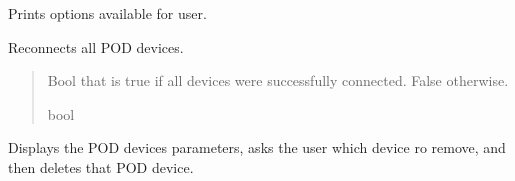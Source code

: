 \documentclass[letterpaper,10pt,english]{sphinxmanual}
\begin{document}
\begin{fulllineitems}
\begin{fulllineitems}
\end{fulllineitems}


\begin{fulllineitems}
\label{\detokenize{Setup_PodDevices:Setup_PodDevices.Setup_PodDevices._PrintOptions}}
\pysigstartsignatures
{}
\pysigstopsignatures
\sphinxAtStartPar
Prints options available for user.

\end{fulllineitems}


\begin{fulllineitems}
\label{\detokenize{Setup_PodDevices:Setup_PodDevices.Setup_PodDevices._Reconnect}}
\pysigstartsignatures
{}
\pysigstopsignatures
\sphinxAtStartPar
Reconnects all POD devices.
\begin{quote}\begin{description}
\sphinxAtStartPar
Bool that is true if all devices were successfully connected. False otherwise.

\sphinxAtStartPar
bool

\end{description}\end{quote}

\end{fulllineitems}


\begin{fulllineitems}
\label{\detokenize{Setup_PodDevices:Setup_PodDevices.Setup_PodDevices._RemoveDevice}}
\pysigstartsignatures
{}
\pysigstopsignatures
\sphinxAtStartPar
Displays the POD devices parameters, asks the user which device ro remove, and then         deletes that POD device.


\end{fulllineitems}
\end{fulllineitems}
\end{document}
